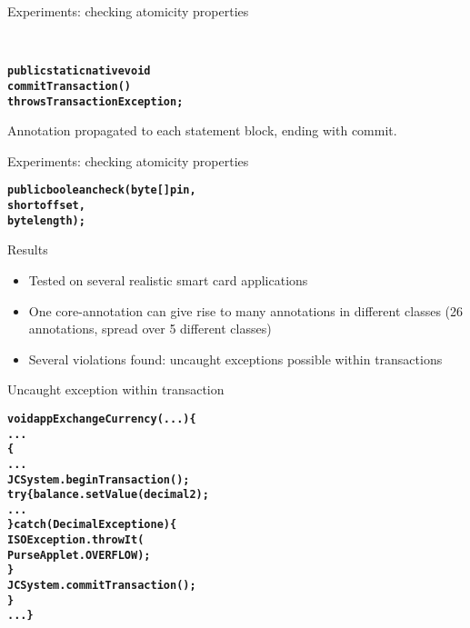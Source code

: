 \documentclass[final,nocolorBG,a4,marieke,nototal,pdf, accumulate,slideColor]{prosper}
\begin{document}
\begin{slide}{Experiments: checking atomicity properties}

\smallskip\\

\begin{alltt}
\textbf{
public static native void 
   commitTransaction() 
         throws TransactionException;}
\end{alltt}
Annotation propagated to each statement block, ending with commit.
\end{slide}

\begin{slide}{Experiments: checking atomicity properties}
\smallskip\\

\begin{alltt}
\textbf{
public boolean check(byte[] pin, 
                     short offset, 
                     byte length);}
\end{alltt}
\end{slide}

\begin{slide}{Results}
\begin{itemize}
\item Tested on several realistic smart card applications
\item One core-annotation can give rise to many annotations in
different classes (26 annotations, spread over 5 different classes)
\item Several violations found: uncaught exceptions possible within
transactions 
\end{itemize}
\end{slide}

\begin{slide}{Uncaught exception within transaction}
\begin{alltt}
\textbf{void appExchangeCurrency(...) \{
   ...
    \{
      ...
      JCSystem.beginTransaction();	
      try \{balance.setValue(decimal2);
            ...
      \} catch (DecimalException e) \{
         ISOException.throwIt(
              PurseApplet.OVERFLOW);
      \}
      JCSystem.commitTransaction();
   \}
   ...\}}
\end{alltt}
\end{slide}
\end{document}
